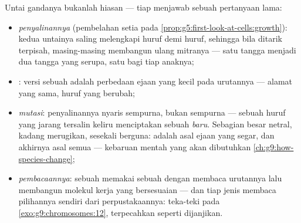 \begin{proposition}\label{prop:g9:genes-and-dna:explains}
Untai gandanya bukanlah hiasan --- tiap  menjawab
sebuah pertanyaan lama:
\begin{itemize}
  \item \emph{penyalinannya}
        (pembelahan setia pada
        \cref{prop:g5:first-look-at-cells:growth}): kedua
        untainya saling melengkapi huruf demi huruf,
        sehingga bila ditarik terpisah, masing-masing
        membangun ulang mitranya --- satu tangga menjadi dua
        tangga yang serupa, satu bagi tiap  anaknya;
  \item \emph{}: versi sebuah  adalah perbedaan
        ejaan yang kecil pada urutannya ---
        alamat yang sama, huruf yang berubah;
  \item \emph{mutasi}: penyalinannya nyaris
        sempurna, bukan sempurna --- sebuah huruf yang
        jarang tersalin keliru menciptakan sebuah 
        \emph{baru}. Sebagian besar netral, kadang
        merugikan, sesekali berguna:  adalah asal
        ejaan yang segar, dan akhirnya asal semua  ---
        kebaruan mentah yang akan dibutuhkan \cref{ch:g9:how-species-change};
  \item \emph{pembacaannya}: sebuah  memakai sebuah 
        dengan membaca urutannya lalu membangun molekul
        kerja yang bersesuaian --- dan tiap jenis 
        membaca pilihannya sendiri dari perpustakaannya:
        teka-teki pada \cref{exo:g9:chromosomes:12},
        terpecahkan seperti dijanjikan.
\end{itemize}
\end{proposition}
\admitted

